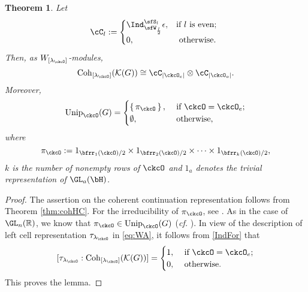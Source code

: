 \documentclass[12pt,a4paper]{amsart}
\def\abs#1{\left|{#1}\right|}
\newcommand{\CK}{{\mathcal {K}}}
\newcommand{\R}{\mathbb R}
\numberwithin{equation}{section}
\newtheorem{thm}{Theorem}[section]
\theoremstyle{remark}
\def\cf{\emph{cf.} }
\def\Unip{\mathrm{Unip}}
\def\lamck{\lambda_\ckcO}
\def\Cint#1{\Coh_{[#1]}}
\def\Coh{\mathrm{Coh}}
\begin{document}
\begin{thm}
  Let
  \[
  \cC_{l}: = \begin{cases}
    \Ind_{\sfW_{\frac{l}{2}}}^{\sfS_{l}}\epsilon,
    & \text{if $l$ is even;}  \\
      0, & \text{ otherwise. } \\
    \end{cases}
  \]
  Then, as $W_{[\lamck]}$-modules,
  \[
    \Cint{\lamck}(\CK(G))  \cong
    \cC_{\abs{\ckcO_{e}}}\otimes \cC_{\abs{\ckcO_{o}}}.
  \]
Moreover, 
 \[
\Unip_{\ckcO}(G)  = \begin{cases}
   \set{\pi_{\ckcO}},
    & \text{ if $\ckcO = \ckcO_{e}$;}  \\
      \emptyset, & \text{ otherwise, } \\
    \end{cases}
  \]
where
  \[
    \pi_{\ckcO} := 1_{\bfrr_1(\ckcO)/2}\times 1_{\bfrr_2(\ckcO)/2} \times \cdots
   \times  1_{\bfrr_k(\ckcO)/2},
  \]
  $k$ is the number of nonempty rows of $\ckcO$
  and $1_{a}$ denotes the trivial representation of $\GL_{a}(\bH)$.

\end{thm}
\begin{proof} The assertion on the coherent continuation representation follows from Theorem \ref{thm:cohHC}. For the irreducibility of $\pi_{\ckcO}$, see \cite[Theorem 3.8]{V.GL}. As in the case of $\GL_n(\R)$, we know that $\pi_{\ckcO}\in \Unip_{\ckcO}(G)$ (\cf \cite[Lemma 8.3]{BVUni}). 
In view of the description of left cell representation $\tau_{\lamck}$ in \eqref{eq:WA}, it follows from \eqref{IndFor} that 
\[
[\tau_{\lamck}:\Cint{\lamck}(\CK(G))]  = \begin{cases}
   1,
    & \text{ if $\ckcO = \ckcO_{e}$;}  \\
      0, & \text{ otherwise.} \\
    \end{cases}
  \]
This proves the lemma. %
\end{proof}
\end{document}
